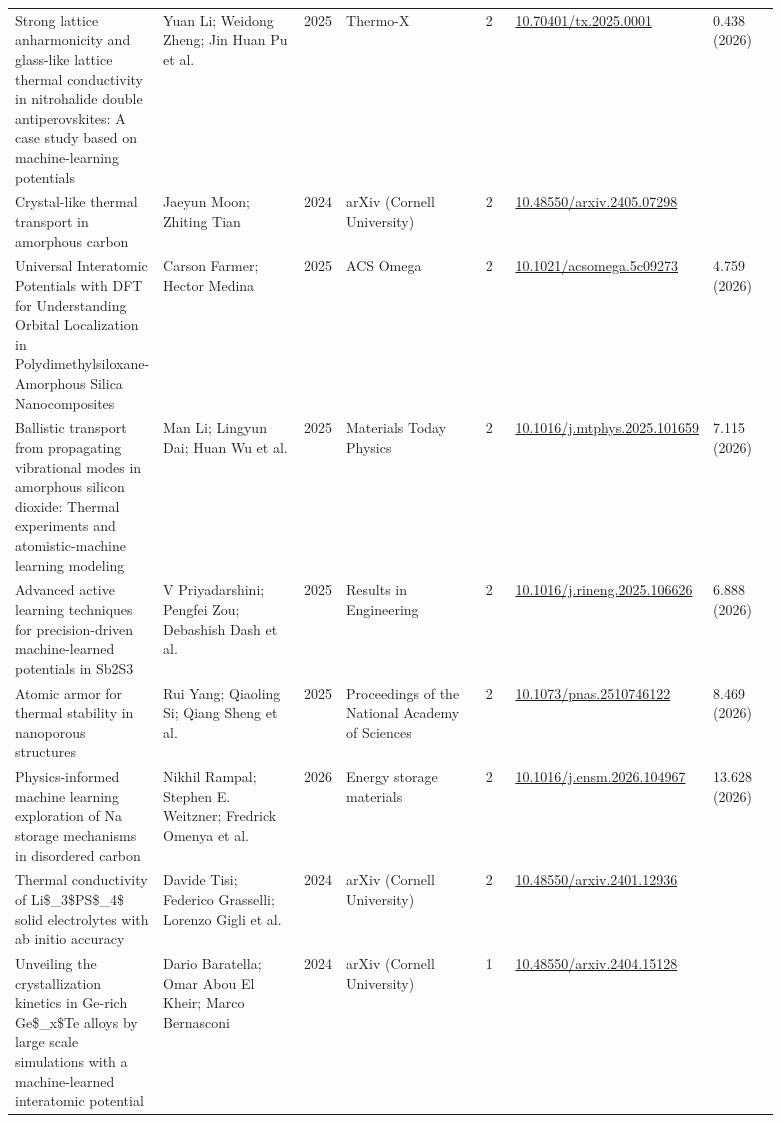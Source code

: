 \documentclass[10pt,a4paper]{article}
\begin{document}
{\begin{longtable}{p{0.192\linewidth}p{0.192\linewidth}p{0.043\linewidth}p{0.192\linewidth}p{0.043\linewidth}p{0.132\linewidth}p{0.096\linewidth}}
Strong lattice anharmonicity and glass-like lattice thermal conductivity in nitrohalide double antiperovskites: A case study based on machine-learning potentials & Yuan Li; Weidong Zheng; Jin Huan Pu et al. & 2025 & Thermo-X & 2 & \href{https://doi.org/10.70401/tx.2025.0001}{10.70401/tx.2025.0001} & 0.438 (2026) \\
Crystal-like thermal transport in amorphous carbon & Jaeyun Moon; Zhiting Tian & 2024 & arXiv (Cornell University) & 2 & \href{https://doi.org/10.48550/arxiv.2405.07298}{10.48550/arxiv.2405.07298} &  \\
Universal Interatomic Potentials with DFT for Understanding Orbital Localization in Polydimethylsiloxane-Amorphous Silica Nanocomposites & Carson Farmer; Hector Medina & 2025 & ACS Omega & 2 & \href{https://doi.org/10.1021/acsomega.5c09273}{10.1021/acsomega.5c09273} & 4.759 (2026) \\
Ballistic transport from propagating vibrational modes in amorphous silicon dioxide: Thermal experiments and atomistic-machine learning modeling & Man Li; Lingyun Dai; Huan Wu et al. & 2025 & Materials Today Physics & 2 & \href{https://doi.org/10.1016/j.mtphys.2025.101659}{10.1016/j.mtphys.2025.101659} & 7.115 (2026) \\
Advanced active learning techniques for precision-driven machine-learned potentials in Sb2S3 & V Priyadarshini; Pengfei Zou; Debashish Dash et al. & 2025 & Results in Engineering & 2 & \href{https://doi.org/10.1016/j.rineng.2025.106626}{10.1016/j.rineng.2025.106626} & 6.888 (2026) \\
Atomic armor for thermal stability in nanoporous structures & Rui Yang; Qiaoling Si; Qiang Sheng et al. & 2025 & Proceedings of the National Academy of Sciences & 2 & \href{https://doi.org/10.1073/pnas.2510746122}{10.1073/pnas.2510746122} & 8.469 (2026) \\
Physics-informed machine learning exploration of Na storage mechanisms in disordered carbon & Nikhil Rampal; Stephen E. Weitzner; Fredrick Omenya et al. & 2026 & Energy storage materials & 2 & \href{https://doi.org/10.1016/j.ensm.2026.104967}{10.1016/j.ensm.2026.104967} & 13.628 (2026) \\
Thermal conductivity of Li\$\_3\$PS\$\_4\$ solid electrolytes with ab initio accuracy & Davide Tisi; Federico Grasselli; Lorenzo Gigli et al. & 2024 & arXiv (Cornell University) & 2 & \href{https://doi.org/10.48550/arxiv.2401.12936}{10.48550/arxiv.2401.12936} &  \\
Unveiling the crystallization kinetics in Ge-rich Ge\$\_x\$Te alloys by large scale simulations with a machine-learned interatomic potential & Dario Baratella; Omar Abou El Kheir; Marco Bernasconi & 2024 & arXiv (Cornell University) & 1 & \href{https://doi.org/10.48550/arxiv.2404.15128}{10.48550/arxiv.2404.15128} &  \\

\end{longtable}}
\end{document}
